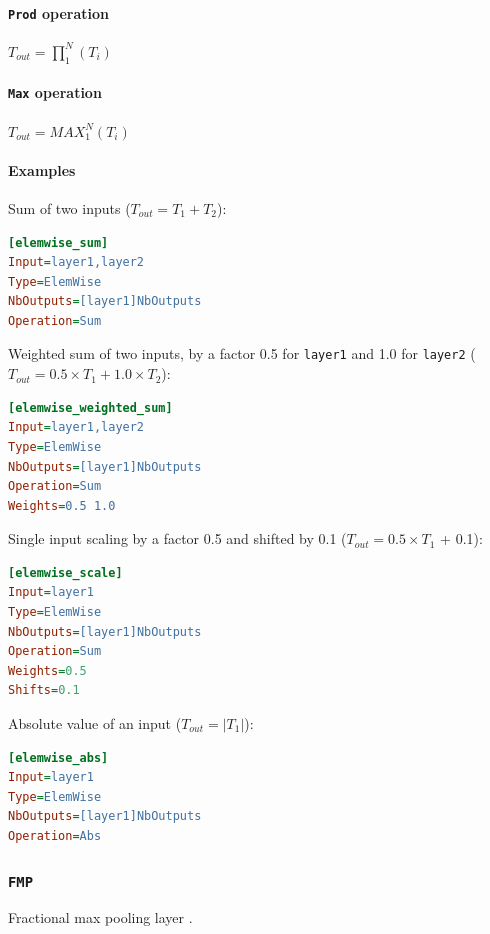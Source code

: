 \documentclass[a4paper,11pt,oneside]{article}
\begin{document}
\paragraph{\texorpdfstring{%
\lstinline[basicstyle=\ttfamily\bfseries]!Prod! operation}{Prod operation}}
$T_{out} = \prod_{1}^{N}(T_{i})$

\paragraph{\texorpdfstring{%
\lstinline[basicstyle=\ttfamily\bfseries]!Max! operation}{Max operation}}
$T_{out} = MAX_{1}^{N}(T_{i})$

\paragraph{Examples}

Sum of two inputs ($T_{out} = T_{1} + T_{2}$):

\begin{lstlisting}[language=ini]
[elemwise_sum]
Input=layer1,layer2
Type=ElemWise
NbOutputs=[layer1]NbOutputs
Operation=Sum
\end{lstlisting}

Weighted sum of two inputs, by a factor 0.5 for \lstinline!layer1! and 1.0 for \lstinline!layer2! ($T_{out} = 0.5 \times T_{1} + 1.0 \times T_{2}$):

\begin{lstlisting}[language=ini]
[elemwise_weighted_sum]
Input=layer1,layer2
Type=ElemWise
NbOutputs=[layer1]NbOutputs
Operation=Sum
Weights=0.5 1.0
\end{lstlisting}

Single input scaling by a factor 0.5 and shifted by 0.1 ($T_{out} = 0.5 \times T_{1}$ + 0.1):

\begin{lstlisting}[language=ini]
[elemwise_scale]
Input=layer1
Type=ElemWise
NbOutputs=[layer1]NbOutputs
Operation=Sum
Weights=0.5
Shifts=0.1
\end{lstlisting}

Absolute value of an input ($T_{out} = |T_{1}|$):

\begin{lstlisting}[language=ini]
[elemwise_abs]
Input=layer1
Type=ElemWise
NbOutputs=[layer1]NbOutputs
Operation=Abs
\end{lstlisting}


\subsubsection{\texorpdfstring{%
\lstinline[basicstyle=\ttfamily\bfseries]!FMP!}{FMP}}
Fractional max pooling layer \citep{Graham2014}.
\end{document}
